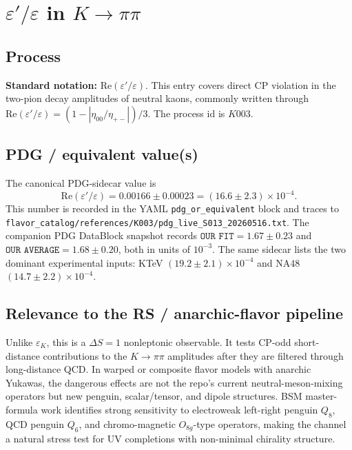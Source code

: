 
\section{\texorpdfstring{\(\varepsilon'/\varepsilon\) in \(K\to\pi\pi\)}{epsilon prime over epsilon in K to pi pi}}

\subsection*{Process}
\textbf{Standard notation:} \(\mathrm{Re}(\varepsilon'/\varepsilon)\).
This entry covers direct CP violation in the two-pion decay amplitudes of
neutral kaons, commonly written through
\(\mathrm{Re}(\varepsilon'/\varepsilon)=(1-|\eta_{00}/\eta_{+-}|)/3\).
The process id is \(K003\).

\subsection*{PDG / equivalent value(s)}
The canonical PDG-sidecar value is
\[
  \mathrm{Re}(\varepsilon'/\varepsilon)=0.00166\pm0.00023
  = (16.6\pm2.3)\times 10^{-4}.
\]
This number is recorded in the YAML \texttt{pdg\_or\_equivalent} block and
traces to
\texttt{flavor\_catalog/references/K003/pdg\_live\_S013\_20260516.txt}.
The companion PDG DataBlock snapshot records \(\texttt{OUR FIT}=1.67\pm0.23\)
and \(\texttt{OUR AVERAGE}=1.68\pm0.20\), both in units of \(10^{-3}\).  The
same sidecar lists the two dominant experimental inputs: KTeV
\((19.2\pm2.1)\times10^{-4}\) and NA48
\((14.7\pm2.2)\times10^{-4}\).

\subsection*{Relevance to the RS / anarchic-flavor pipeline}
Unlike \(\varepsilon_K\), this is a \(\Delta S=1\) nonleptonic observable.
It tests CP-odd short-distance contributions to the \(K\to\pi\pi\) amplitudes
after they are filtered through long-distance QCD.  In warped or composite
flavor models with anarchic Yukawas, the dangerous effects are not the
repo's current neutral-meson-mixing operators but new penguin, scalar/tensor,
and dipole structures.  BSM master-formula work identifies strong sensitivity
to electroweak left-right penguin \(Q_8\), QCD penguin \(Q_6\), and
chromo-magnetic \(O_{8g}\)-type operators, making the channel a natural
stress test for UV completions with non-minimal chirality structure.

